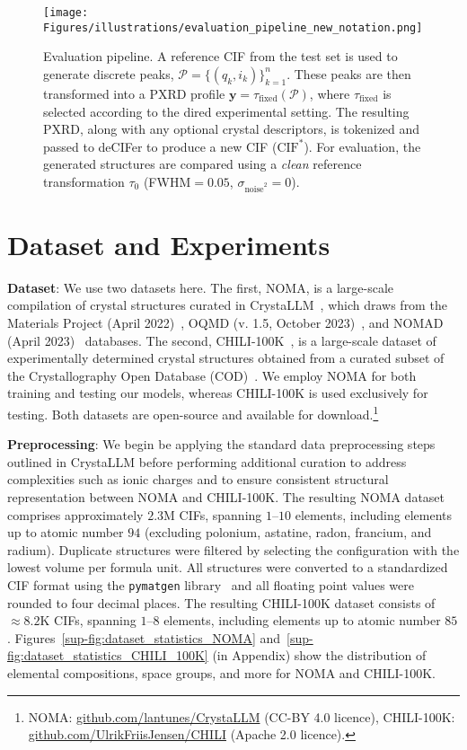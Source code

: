 \begin{figure}[t]
\begin{center}
\centerline{\texttt{[image: Figures/illustrations/evaluation\_pipeline\_new\_notation.png]}}
\caption{Evaluation pipeline. A reference CIF from the test set is used to generate discrete peaks, $\mathcal{P} = \{(q_k, i_k)\}_{k=1}^n$. These peaks are then transformed into a PXRD profile $\mathbf{y} = \tau_{\mathrm{fixed}}(\mathcal{P})$, where $\tau_{\mathrm{fixed}}$ is selected according to the dired experimental setting. The resulting PXRD, along with any optional crystal descriptors, is tokenized and passed to deCIFer to produce a new CIF ($\text{CIF}^*$). For evaluation, the generated structures are compared using a \emph{clean} reference transformation $\tau_0$ (FWHM$=0.05$, $\sigma_{\mathrm{noise}^2} = 0$).
} \label{fig:evaluation-pipeline}
\end{center}
\vskip -0.2in
\end{figure}

\section{Dataset and Experiments}

{\bf Dataset}: We use two datasets here. The first, NOMA, is a large-scale compilation of crystal structures curated in CrystaLLM~\cite{antunes2024crystalstructuregenerationautoregressive}, which draws from the Materials Project (April 2022)~\cite{materialsproject2013}, OQMD (v. 1.5, October 2023)~\cite{kirklin2015open}, and NOMAD (April 2023)~\cite{nomad2019} databases. The second, CHILI-100K~\cite{FriisJensenJohansen2024}, is a large-scale dataset of experimentally determined crystal structures obtained from a curated subset of the Crystallography Open Database (COD)~\cite{COD2009}. We employ NOMA for both training and testing our models, whereas CHILI-100K is used exclusively for testing. Both datasets are open-source and available for download.\footnote{NOMA: \url{github.com/lantunes/CrystaLLM} (CC-BY 4.0 licence), CHILI-100K: \url{github.com/UlrikFriisJensen/CHILI} (Apache 2.0 licence).}

{\bf Preprocessing}: We begin be applying the standard data preprocessing steps outlined in CrystaLLM before performing additional curation to address complexities such as ionic charges and to ensure consistent structural representation between NOMA and CHILI-100K. The resulting NOMA dataset comprises approximately $2.3$M CIFs, spanning $1$--$10$ elements, including elements up to atomic number $94$ (excluding polonium, astatine, radon, francium, and radium). Duplicate structures were filtered by selecting the configuration with the lowest volume per formula unit. All structures were converted to a standardized CIF format using the \texttt{\small pymatgen} library~\cite{Ong2013} and all floating point values were rounded to four decimal places. The resulting CHILI-100K dataset consists of $\approx\!8.2$K CIFs, spanning $1$--$8$ elements, including elements up to atomic number $85$. Figures~\ref{sup-fig:dataset_statistics_NOMA} and~\ref{sup-fig:dataset_statistics_CHILI_100K} (in Appendix) show the distribution of elemental compositions, space groups, and more for NOMA and CHILI-100K.

